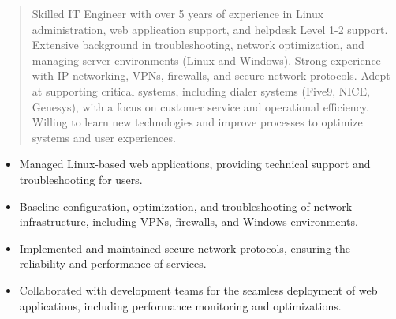 



\makecvheader

\begin{quote}
  \noindent
  Skilled IT Engineer with over 5 years of experience in Linux administration, web application support, and helpdesk Level 1-2 support. Extensive background in troubleshooting, network optimization, and managing server environments (Linux and Windows). Strong experience with IP networking, VPNs, firewalls, and secure network protocols. Adept at supporting critical systems, including dialer systems (Five9, NICE, Genesys), with a focus on customer service and operational efficiency. Willing to learn new technologies and improve processes to optimize systems and user experiences.
\end{quote}

\par\smallskip
\noindent
\begin{minipage}{20cm}
  \begin{minipage}{9.75cm}
    \begin{itemize}
      \item Managed Linux-based web applications, providing technical support and troubleshooting for users.
      \item Baseline configuration, optimization, and troubleshooting of network infrastructure, including VPNs, firewalls, and Windows environments.
    \end{itemize}
  \end{minipage}
  \hfill
  \begin{minipage}{9.75cm}
    \begin{itemize}
      \item Implemented and maintained secure network protocols, ensuring the reliability and performance of services.
      \item Collaborated with development teams for the seamless deployment of web applications, including performance monitoring and optimizations.
    \end{itemize}
  \end{minipage}
\end{minipage}
\par\smallskip
\divider

